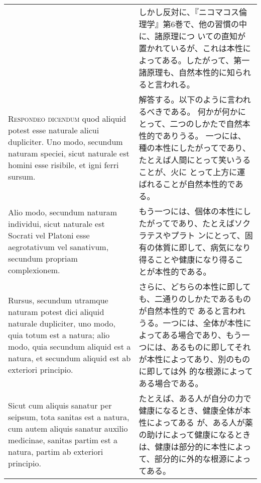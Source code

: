 \documentclass[10pt]{jsarticle} %
\begin{document}
\begin{longtable}{p{21em}p{21em}}
&

しかし反対に、『ニコマコス倫理学』第6巻で、他の習慣の中に、諸原理につ
 いての直知が置かれているが、これは本性によってある。したがって、第一
 諸原理も、自然本性的に知られると言われる。

\\


{\scshape Respondeo dicendum} quod aliquid potest esse naturale alicui
 dupliciter. Uno modo, secundum naturam speciei, sicut naturale est
 homini esse risibile, et igni ferri sursum. 


&

解答する。以下のように言われるべきである。
何かが何かにとって、二つのしかたで自然本性的でありうる。
一つには、種の本性にしたがってであり、たとえば人間にとって笑いうることが、火に
 とって上方に運ばれることが自然本性的である。

\\



Alio modo, secundum naturam individui, sicut naturale est Socrati vel
Platoni esse aegrotativum vel sanativum, secundum propriam
complexionem.


&

もう一つには、個体の本性にしたがってであり、たとえばソクラテスやプラト
 ンにとって、固有の体質に即して、病気になり得ることや健康になり得るこ
 とが本性的である。

\\



Rursus, secundum utramque naturam potest dici aliquid naturale
dupliciter, uno modo, quia totum est a natura; alio modo, quia
secundum aliquid est a natura, et secundum aliquid est ab exteriori
principio.


&

さらに、どちらの本性に即しても、二通りのしかたであるものが自然本性的で
 あると言われうる。一つには、全体が本性によってある場合であり、もう一
 つには、あるものに即してそれが本性によってあり、別のものに即しては外
 的な根源によってある場合である。

\\



Sicut cum aliquis sanatur per seipsum, tota sanitas est a natura, cum
autem aliquis sanatur auxilio medicinae, sanitas partim est a natura,
partim ab exteriori principio.


&

たとえば、ある人が自分の力で健康になるとき、健康全体が本性によってある
 が、ある人が薬の助けによって健康になるときは、健康は部分的に本性によっ
 て、部分的に外的な根源によってある。


\end{longtable}
\end{document}
